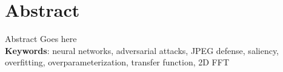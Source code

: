 \section*{Abstract}
Abstract Goes here \\[1cm]

\noindent\textbf{Keywords}: neural networks, adversarial attacks, JPEG defense, saliency, overfitting, overparameterization, transfer function, 2D FFT